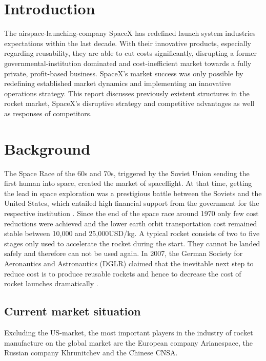 \documentclass[11pt,a4paper]{article}
\begin{document}
\section{Introduction}\label{introduction}
The airspace-launching-company SpaceX has redefined launch system industries expectations within the last decade. With their innovative products, especially regarding reusability, they are able to cut costs significantly, disrupting  a former governmental-institution dominated and cost-inefficient market towards a fully private, profit-based business. SpaceX’s market success was only possible by redefining established market dynamics and implementing an innovative operations strategy. This report discusses previously existent structures in the rocket market, SpaceX’s disruptive strategy  and competitive advantages as well as responses of competitors.
\section{Background}\label{background}

The Space Race of the 60s and 70s, triggered by the Soviet Union sending the first human into space, created the market of spaceflight. At that time, getting the lead in space exploration was a prestigious battle between the Soviets and the United States, which entailed high financial support from the government for the respective institution \cite{scs57}. Since the end of the space race around 1970 only few cost reductions were achieved and the lower earth orbit transportation cost remained stable between 10,000 and 25,000USD/kg. A typical rocket consists of two to five stages only used to accelerate the rocket during the start. They cannot be landed safely and therefore can not be used again. In 2007, the German Society for Aeronautics and Astronautics (DGLR) claimed that the inevitable next step to reduce cost is to produce reusable rockets and hence to decrease the cost of rocket launches dramatically \cite{scs58}.
\subsection{ Current market situation}\label{current-market-situation}

Excluding the US-market, the most important players in the industry of rocket manufacture on the global market are the European company Arianespace, the Russian company Khrunitchev and the Chinese CNSA.
\end{document}
